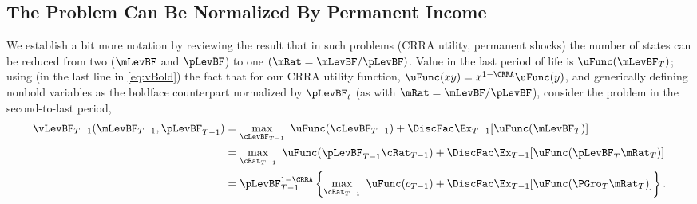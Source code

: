 \documentclass[BufferStockTheory]{subfiles}
\begin{document}
\hypertarget{The-Problem-Can-Be-Rewritten-in-Ratio-Form}{}
\hypertarget{The-Problem-Can-Be-Normalized-By-Permanent-Income}{}
\subsection{The Problem Can Be Normalized By Permanent Income}

\label{subsec:ratio}

We establish a bit more notation by reviewing the result that in such problems (CRRA utility, permanent shocks) the number of states can be reduced from two ($\mLevBF$ and $\pLevBF$) to one $(\mRat = \mLevBF/\pLevBF)$.  Value in the last period of life is $\uFunc(\mLevBF_{T})$; using (in the last line in \eqref{eq:vBold}) the fact that for our CRRA utility function, $\uFunc(xy) = x^{1-\CRRA}\uFunc(y)$, and generically defining nonbold variables as the boldface counterpart normalized by $\pLevBF_{t}$ (as with $\mRat=\mLevBF/\pLevBF$), consider the problem in the second-to-last period,
\begin{align}
  \vLevBF_{T-1}(\mLevBF_{T-1},\pLevBF_{T-1})  & = 
                                                \max_{\cLevBF_{T-1}}~ \uFunc(\cLevBF_{T-1}) +\DiscFac \Ex_{T-1} [ \uFunc(\mLevBF_{T})]
                                                \notag \\
                                              & =  \max_{\cRat_{T-1}}~
                                                \uFunc(\pLevBF_{T-1}\cRat_{T-1}) + \DiscFac  \Ex_{T-1} [\uFunc(\pLevBF_{T}{\mRat}
                                                _{T})]  \notag \\
                                              & = \pLevBF_{T-1}^{1-\CRRA}
                                                \left\{\max_{\cRat_{T-1}}~ \uFunc(c_{T-1}) + \DiscFac \Ex_{T-1} [ \uFunc( {\PGro}_{T}
                                                {\mRat}_{T}) ] \right\}.   \label{eq:vBold}
\end{align}
\end{document}
